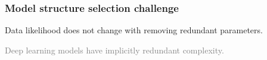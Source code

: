 \documentclass[usenames,dvipsnames,11pt,pdf,utf8,russian,aspectratio=43]{beamer}
\begin{document}
\begin{frame}    
                                                                                                                        
\frametitle{Model structure selection challenge}     
Data likelihood does not change with removing redundant parameters.
\begin{figure}[h]                                                                                                                               
\centering                                                                                                                                      
\hspace*{-1cm}                                       
\end{figure}                                                                                                   
\textcolor{gray}{Deep learning models have implicitly redundant complexity.}  

                                                                                                                                             
\end{frame}    
\end{document}
